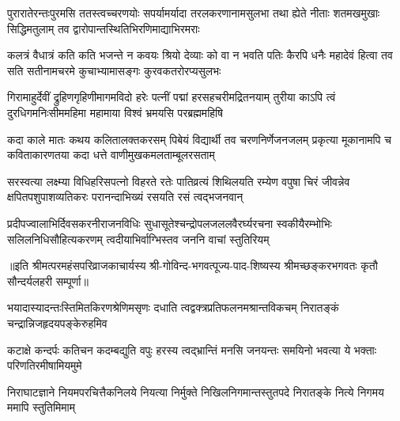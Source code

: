 \fourlineindentedshloka
{पुरारातेरन्तःपुरमसि ततस्त्वच्चरणयोः}
{सपर्यामर्यादा तरलकरणानामसुलभा}
{तथा ह्येते नीताः शतमखमुखाः सिद्धिमतुलाम्}
{तव द्वारोपान्तस्थितिभिरणिमाद्याभिरमराः}%

\fourlineindentedshloka
{कलत्रं वैधात्रं कति कति भजन्ते न कवयः}
{श्रियो देव्याः को वा न भवति पतिः कैरपि धनैः}
{महादेवं हित्वा तव सति सतीनामचरमे}
{कुचाभ्यामासङ्गः कुरवकतरोरप्यसुलभः}%

\fourlineindentedshloka
{गिरामाहुर्देवीं द्रुहिणगृहिणीमागमविदो}
{हरेः पत्नीं पद्मां हरसहचरीमद्रितनयाम्}
{तुरीया काऽपि त्वं दुरधिगमनिःसीममहिमा}
{महामाया विश्वं भ्रमयसि परब्रह्ममहिषि}%

\fourlineindentedshloka
{कदा काले मातः कथय कलितालक्तकरसम्}
{पिबेयं विद्यार्थी तव चरणनिर्णेजनजलम्}
{प्रकृत्या मूकानामपि च कविताकारणतया}
{कदा धत्ते वाणीमुखकमलताम्बूलरसताम्}%

\fourlineindentedshloka
{सरस्वत्या लक्ष्म्या विधिहरिसपत्नो विहरते}
{रतेः पातिव्रत्यं शिथिलयति रम्येण वपुषा}
{चिरं जीवन्नेव क्षपितपशुपाशव्यतिकरः}
{परानन्दाभिख्यं रसयति रसं त्वद्भजनवान्}%

\fourlineindentedshloka
{प्रदीपज्वालाभिर्दिवसकरनीराजनविधिः}
{सुधासूतेश्चन्द्रोपलजललवैरर्घ्यरचना}
{स्वकीयैरम्भोभिः सलिलनिधिसौहित्यकरणम्}
{त्वदीयाभिर्वाग्भिस्तव जननि वाचां स्तुतिरियम्}%

॥इति  श्रीमत्परमहंसपरिव्राजकाचार्यस्य श्री-गोविन्द-भगवत्पूज्य-पाद-शिष्यस्य
श्रीमच्छङ्करभगवतः कृतौ सौन्दर्यलहरी सम्पूर्णा॥


\closesection

{भयादास्यादन्तःस्तिमितकिरणश्रेणिमसृणः}
{दधाति त्वद्वक्त्रप्रतिफलनमश्रान्तविकचम्}
{निरातङ्कं चन्द्रान्निजहृदयपङ्केरुहमिव}%

{कटाक्षे कन्दर्पः कतिचन कदम्बद्युति वपुः}
{हरस्य त्वद्भ्रान्तिं मनसि जनयन्तः समयिनो}
{भवत्या ये भक्ताः परिणतिरमीषामियमुमे}%

{निराघाटज्ञाने नियमपरचित्तैकनिलये}
{नियत्या निर्मुक्ते निखिलनिगमान्तस्तुतपदे}
{निरातङ्के नित्ये निगमय ममापि स्तुतिमिमाम्}%

